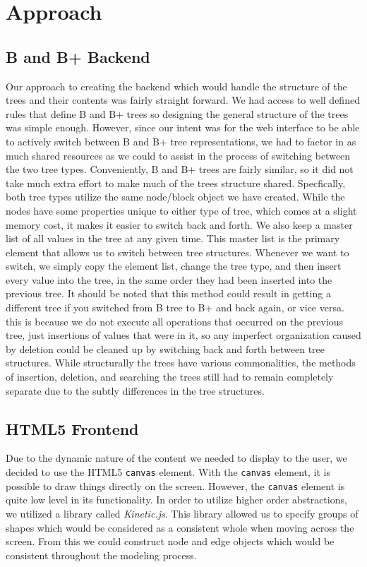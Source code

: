 \section{Approach}

\subsection{B and B+ Backend}
Our approach to creating the backend which would handle the structure
of the trees and their contents was fairly straight forward.  We had
access to well defined rules that define B and B+ trees so designing
the general structure of the trees was simple enough.  However, since
our intent was for the web interface to be able to actively switch
between B and B+ tree representations, we had to factor in as much
shared resources as we could to assist in the process of switching
between the two tree types.  Conveniently, B and B+ trees are fairly
similar, so it did not take much extra effort to make much of the
trees structure shared.  Specfically, both tree types utilize the
same node/block object we have created.  While the nodes have some
properties unique to either type of tree, which comes at a slight
memory cost, it makes it easier to switch back and forth.  We also
keep a master list of all values in the tree at any given time.  This
master list is the primary element that allows us to switch between
tree structures.  Whenever we want to switch, we simply copy the
element list, change the tree type, and then insert every value into
the tree, in the same order they had been inserted into the previous
tree.  It should be noted that this method could result in getting a
different tree if you switched from B tree to B+ and back again, or
vice versa.  this is because we do not execute all operations that
occurred on the previous tree, just insertions of values that were in
it, so any imperfect organization caused by deletion could be cleaned
up by switching back and forth between tree structures.  While
structurally the trees have various commonalities, the methods of
insertion, deletion, and searching the trees still had to remain
completely separate due to the subtly differences in the tree
structures.

\subsection{HTML5 Frontend}
Due to the dynamic nature of the content we needed to display to the
user, we decided to use the HTML5 \texttt{canvas} element. With the
\texttt{canvas} element, it is possible to draw things directly on the
screen. However, the \texttt{canvas} element is quite low level in
its functionality. In order to utilize higher order abstractions, we
utilized a library called \textit{Kinetic.js}. This library allowed us
to specify groups of shapes which would be considered as a consistent
whole when moving across the screen. From this we could construct node
and edge objects which would be consistent throughout the modeling
process.

